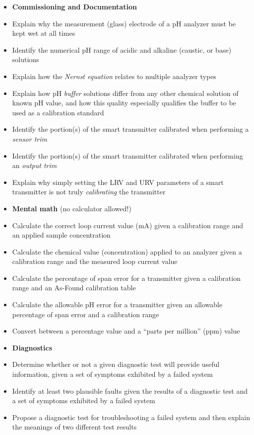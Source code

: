 \filbreak

\begin{itemize}
\item{} {\bf Commissioning and Documentation}
\item{} Explain why the measurement (glass) electrode of a pH analyzer must be kept wet at all times
\item{} Identify the numerical pH range of acidic and alkaline (caustic, or base) solutions
\item{} Explain how the {\it Nernst equation} relates to multiple analyzer types
\item{} Explain how pH {\it buffer} solutions differ from any other chemical solution of known pH value, and how this quality especially qualifies the buffer to be used as a calibration standard
\item{} Identify the portion(s) of the smart transmitter calibrated when performing a {\it sensor trim}
\item{} Identify the portion(s) of the smart transmitter calibrated when performing an {\it output trim}
\item{} Explain why simply setting the LRV and URV parameters of a smart transmitter is not truly {\it calibrating} the transmitter
\end{itemize}

\filbreak

\begin{itemize}
\item{} {\bf Mental math} (no calculator allowed!)
\item{} Calculate the correct loop current value (mA) given a calibration range and an applied sample concentration 
\item{} Calculate the chemical value (concentration) applied to an analyzer given a calibration range and the measured loop current value
\item{} Calculate the percentage of span error for a transmitter given a calibration range and an As-Found calibration table 
\item{} Calculate the allowable pH error for a transmitter given an allowable percentage of span error and a calibration range
\item{} Convert between a percentage value and a ``parts per million'' (ppm) value
\end{itemize}

\filbreak

\begin{itemize}
\item{} {\bf Diagnostics}
\item{} Determine whether or not a given diagnostic test will provide useful information, given a set of symptoms exhibited by a failed system
\item{} Identify at least two plausible faults given the results of a diagnostic test and a set of symptoms exhibited by a failed system
\item{} Propose a diagnostic test for troubleshooting a failed system and then explain the meanings of two different test results
\end{itemize}



